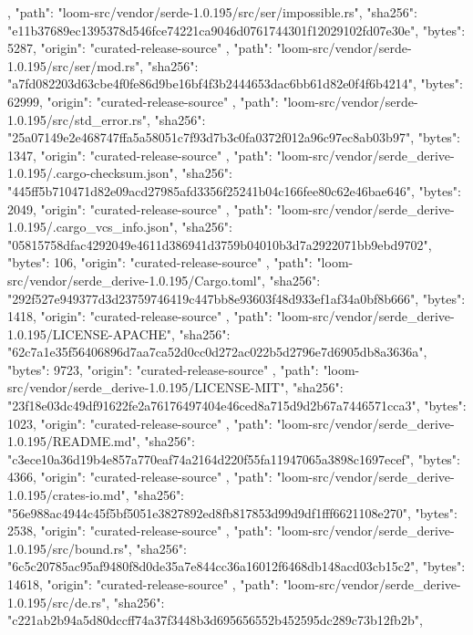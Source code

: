 {{    },
    {
      "path": "loom-src/vendor/serde-1.0.195/src/ser/impossible.rs",
      "sha256": "e11b37689ec1395378d546fce74221ca9046d0761744301f12029102fd07e30e",
      "bytes": 5287,
      "origin": "curated-release-source"
    },
    {
      "path": "loom-src/vendor/serde-1.0.195/src/ser/mod.rs",
      "sha256": "a7fd082203d63cbe4f0fe86d9be16bf4f3b2444653dac6bb61d82e0f4f6b4214",
      "bytes": 62999,
      "origin": "curated-release-source"
    },
    {
      "path": "loom-src/vendor/serde-1.0.195/src/std_error.rs",
      "sha256": "25a07149e2e468747ffa5a58051c7f93d7b3c0fa0372f012a96c97ec8ab03b97",
      "bytes": 1347,
      "origin": "curated-release-source"
    },
    {
      "path": "loom-src/vendor/serde_derive-1.0.195/.cargo-checksum.json",
      "sha256": "445ff5b710471d82e09acd27985afd3356f25241b04c166fee80c62e46bae646",
      "bytes": 2049,
      "origin": "curated-release-source"
    },
    {
      "path": "loom-src/vendor/serde_derive-1.0.195/.cargo_vcs_info.json",
      "sha256": "05815758dfac4292049e4611d386941d3759b04010b3d7a2922071bb9ebd9702",
      "bytes": 106,
      "origin": "curated-release-source"
    },
    {
      "path": "loom-src/vendor/serde_derive-1.0.195/Cargo.toml",
      "sha256": "292f527e949377d3d23759746419c447bb8e93603f48d933ef1af34a0bf8b666",
      "bytes": 1418,
      "origin": "curated-release-source"
    },
    {
      "path": "loom-src/vendor/serde_derive-1.0.195/LICENSE-APACHE",
      "sha256": "62c7a1e35f56406896d7aa7ca52d0cc0d272ac022b5d2796e7d6905db8a3636a",
      "bytes": 9723,
      "origin": "curated-release-source"
    },
    {
      "path": "loom-src/vendor/serde_derive-1.0.195/LICENSE-MIT",
      "sha256": "23f18e03dc49df91622fe2a76176497404e46ced8a715d9d2b67a7446571cca3",
      "bytes": 1023,
      "origin": "curated-release-source"
    },
    {
      "path": "loom-src/vendor/serde_derive-1.0.195/README.md",
      "sha256": "c3ece10a36d19b4e857a770eaf74a2164d220f55fa11947065a3898c1697ecef",
      "bytes": 4366,
      "origin": "curated-release-source"
    },
    {
      "path": "loom-src/vendor/serde_derive-1.0.195/crates-io.md",
      "sha256": "56e988ac4944c45f5bf5051e3827892ed8fb817853d99d9df1fff6621108e270",
      "bytes": 2538,
      "origin": "curated-release-source"
    },
    {
      "path": "loom-src/vendor/serde_derive-1.0.195/src/bound.rs",
      "sha256": "6c5c20785ac95af9480f8d0de35a7e844cc36a16012f6468db148acd03cb15c2",
      "bytes": 14618,
      "origin": "curated-release-source"
    },
    {
      "path": "loom-src/vendor/serde_derive-1.0.195/src/de.rs",
      "sha256": "c221ab2b94a5d80dccff74a37f3448b3d695656552b452595dc289c73b12fb2b",
}}
